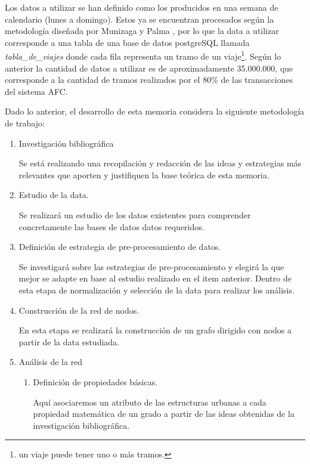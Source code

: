 \documentclass[itshape,12pt]{article}
\begin{document}
              Los datos a utilizar se han definido como los producidos en una semana de calendario (lunes a domingo). Estos ya se encuentran procesados según la metodología diseñada por Munizaga y Palma \cite{Procesamiento_datos}, por lo que la data a utilizar corresponde a una tabla de una base de datos postgreSQL llamada \textit{tabla\_de\_viajes} donde cada fila representa un tramo de un viaje\footnote{un viaje puede tener uno o más tramos.}. Según lo anterior la cantidad de datos a utilizar es de aproximadamente 35.000.000, que corresponde a la cantidad de tramos realizados por el 80\% de las transacciones del sistema AFC.

              Dado lo anterior, el desarrollo de esta memoria considera la siguiente metodología de trabajo:

              \begin{enumerate}
          \item Investigación bibliográfica

              Se está realizando una recopilación y redacción de las ideas y estrategias más relevantes que aporten y justifiquen la base teórica de esta memoria.

              \item Estudio de la data.

              Se realizará un estudio de los datos existentes para comprender concretamente las bases de datos datos requeridos.  

              \item Definición de estrategia de pre-procesamiento de datos.

              Se investigará sobre las estrategias de pre-procesamiento y elegirá la que mejor se adapte en base al estudio realizado en el item anterior. Dentro de esta etapa de normalización y selección de la data para realizar los análisis.

              \item Construcción de la red de nodos.

              En esta etapa se realizará la construcción de un grafo dirigido con nodos a partir de la data estudiada.

              \item Análisis de la red
              \begin{enumerate}
          \item Definición de propiedades básicas.

              Aquí asociaremos un atributo de las estructuras urbanas a cada propiedad matemática de un grado a partir de las ideas obtenidas de la investigación bibliográfica.


\end{enumerate}
\end{enumerate}
\end{document}
